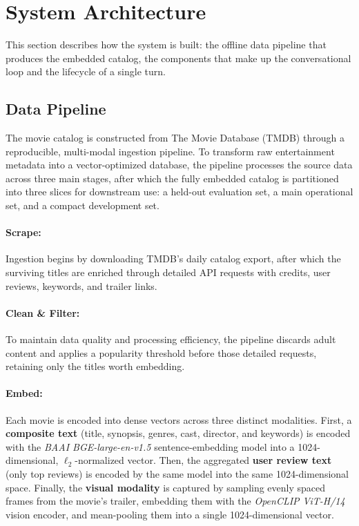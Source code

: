 \section{System Architecture}\label{sec:architecture}

This section describes how the system is built: the offline data pipeline that produces the
embedded catalog, the components that make up the conversational loop and the lifecycle of a single
turn.

\subsection{Data Pipeline}

The movie catalog is constructed from The Movie Database (TMDB) through a reproducible, multi-modal ingestion pipeline.
To transform raw entertainment metadata into a vector-optimized database, the pipeline processes the source data across three main stages, after which the fully embedded catalog is partitioned into three slices for downstream use: a held-out evaluation set, a main operational set, and a compact development set.

\paragraph{Scrape:} Ingestion begins by downloading TMDB's daily catalog export, after which the surviving titles are enriched through detailed API requests with credits, user reviews, keywords, and trailer links.

\paragraph{Clean \& Filter:} To maintain data quality and processing efficiency, the pipeline discards adult content and applies a popularity threshold before those detailed requests, retaining only the titles worth embedding.

\paragraph{Embed:} Each movie is encoded into dense vectors across three distinct modalities.
First, a \textbf{composite text} (title, synopsis, genres, cast, director, and keywords) is encoded with the \emph{BAAI BGE-large-en-v1.5} sentence-embedding model into a 1024-dimensional, $\ell_2$-normalized vector.
Then, the aggregated \textbf{user review text} (only top reviews) is encoded by the same model into the same 1024-dimensional space.
Finally, the \textbf{visual modality} is captured by sampling evenly spaced frames from the movie's trailer, embedding them with the \emph{OpenCLIP ViT-H/14} vision encoder, and mean-pooling them into a single 1024-dimensional vector.

